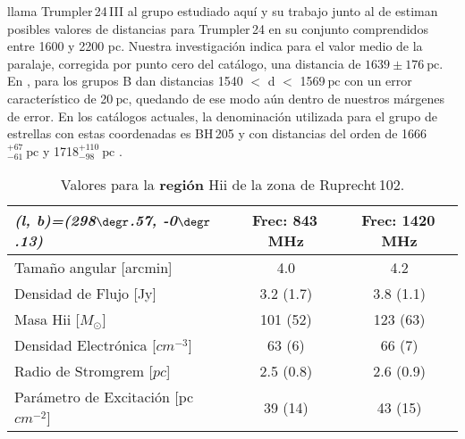 \documentclass[baaa]{baaa}
\begin{document}
\citet{1968se} llama Trumpler\,24\,III al grupo estudiado aqu\'i y su trabajo junto al de \citet{1984h} estiman posibles valores de distancias para Trumpler\,24 en su conjunto comprendidos entre 1600 y 2200 pc. Nuestra investigaci\'on indica para el valor medio de la pa\-ralaje, corregida por punto cero del cat\'alogo, una distancia de $1639 \pm  176~\mathrm{pc}$. En \citet{miotrumpler24}, para los grupos B dan distancias 1540 $<$ d $<$ 1569$~\mathrm{pc}$ con un error caracter\'istico de 20$~\mathrm{pc}$, quedando de ese modo a\'un dentro de nuestros m\'argenes de error. En los cat\'alogos actuales, la denominaci\'on utilizada para el grupo de estrellas con estas coordenadas es BH\,205 y con distancias del orden de 1666$_{-61}^{+67}~\mathrm{pc}$ \citep{2019liu} y 1718$_{-98}^{+110}~\mathrm{pc}$ \citep{2021poggio}.






\begin{table*}
\centering
\begin{tabular}{lcc}
\hline
\hline
\textit{\textbf{(l, b)=(298$\degr$.57, -0$\degr$.13)}} & \textbf{Frec: 843\,MHz} & \textbf{Frec: 1420\,MHz} \\
\hline
Tama\~no angular [arcmin] & 4.0 & 4.2 \\
 Densidad de Flujo [Jy] & 3.2 (1.7) & 3.8 (1.1)\\
 Masa H{\sc ii} [$M_{\odot}$] & 101 (52) & 123 (63)\\
Densidad Electrónica [$cm^{-3}$] & 63 (6) & 66 (7)\\
Radio de Stromgrem [$pc$] & 2.5 (0.8) & 2.6 (0.9)\\
Parámetro de Excitación [pc\,$cm^{-2}$] & 39 (14) & 43 (15)\\
\hline
\end{tabular}
\caption{Valores para la {\bf región} H{\sc ii} de la zona de Ruprecht\,102.}
\label{estadistica}
\end{table*}
\end{document}

